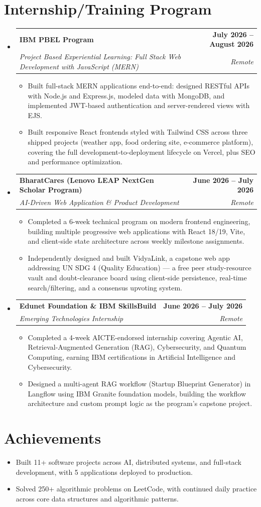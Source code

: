 \documentclass[letterpaper,10pt]{article}
\makeatletter
\newcommand{\resumeItem}[1]{
  \item\small{
    {#1 \vspace{-2pt}}
  }
}
\newcommand{\resumeSubheading}[4]{
  \vspace{-2pt}\item
    \begin{tabular*}{1.0\textwidth}[t]{l@{\extracolsep{\fill}}r}
      \textbf{#1} & \textbf{\small #2} \\
      \textit{\small#3} & \textit{\small #4} \\
    \end{tabular*}\vspace{-7pt}
}
\newcommand{\resumeSubHeadingListStart}{\begin{itemize}[leftmargin=0.0in, label={}]}
\newcommand{\resumeSubHeadingListEnd}{\end{itemize}}
\newcommand{\resumeItemListStart}{\begin{itemize}}
\newcommand{\resumeItemListEnd}{\end{itemize}\vspace{-5pt}}
\makeatother
\begin{document}
\section{Internship/Training Program}
  \resumeSubHeadingListStart
    \resumeSubheading
      {IBM PBEL Program}{July 2026 -- August 2026}
      {Project Based Experiential Learning: Full Stack Web Development with JavaScript (MERN)}{Remote}
      \resumeItemListStart
        \resumeItem{Built full-stack MERN applications end-to-end: designed RESTful APIs with Node.js and Express.js, modeled data with MongoDB, and implemented JWT-based authentication and server-rendered views with EJS.}
        \resumeItem{Built responsive React frontends styled with Tailwind CSS across three shipped projects (weather app, food ordering site, e-commerce platform), covering the full development-to-deployment lifecycle on Vercel, plus SEO and performance optimization.}
      \resumeItemListEnd
    \resumeSubheading
      {BharatCares (Lenovo LEAP NextGen Scholar Program)}{June 2026 -- July 2026}
      {AI-Driven Web Application \& Product Development}{Remote}
      \resumeItemListStart
        \resumeItem{Completed a 6-week technical program on modern frontend engineering, building multiple progressive web applications with React 18/19, Vite, and client-side state architecture across weekly milestone assignments.}
        \resumeItem{Independently designed and built VidyaLink, a capstone web app addressing UN SDG 4 (Quality Education) — a free peer study-resource vault and doubt-clearance board using client-side persistence, real-time search/filtering, and a consensus upvoting system.}
      \resumeItemListEnd
    \resumeSubheading
      {Edunet Foundation \& IBM SkillsBuild}{June 2026 -- July 2026}
      {Emerging Technologies Internship}{Remote}
      \resumeItemListStart
        \resumeItem{Completed a 4-week AICTE-endorsed internship covering Agentic AI, Retrieval-Augmented Generation (RAG), Cybersecurity, and Quantum Computing, earning IBM certifications in Artificial Intelligence and Cybersecurity.}
        \resumeItem{Designed a multi-agent RAG workflow (Startup Blueprint Generator) in Langflow using IBM Granite foundation models, building the workflow architecture and custom prompt logic as the program's capstone project.}
      \resumeItemListEnd
  \resumeSubHeadingListEnd
\vspace{-12pt}

\section{Achievements}
      \resumeItemListStart
\resumeItem{Built 11+ software projects across AI, distributed systems, and full-stack development, with 5 applications deployed to production.}
  \vspace{-16pt}
\resumeItem{Solved 250+ algorithmic problems on LeetCode, with continued daily practice across core data structures and algorithmic patterns.}
     \resumeItemListEnd
\end{document}
